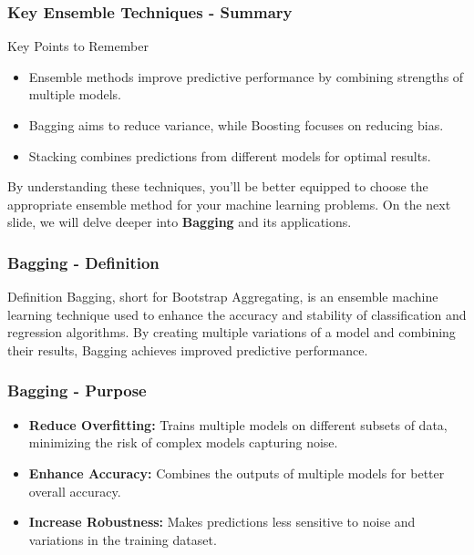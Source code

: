 \documentclass[aspectratio=169]{beamer}
\begin{document}
\begin{frame}[fragile]
    \frametitle{Key Ensemble Techniques - Summary}
    \begin{block}{Key Points to Remember}
        \begin{itemize}
            \item Ensemble methods improve predictive performance by combining strengths of multiple models.
            \item Bagging aims to reduce variance, while Boosting focuses on reducing bias.
            \item Stacking combines predictions from different models for optimal results.
        \end{itemize}
    \end{block}
    By understanding these techniques, you'll be better equipped to choose the appropriate ensemble method for your machine learning problems. 
    On the next slide, we will delve deeper into \textbf{Bagging} and its applications.
\end{frame}

\begin{frame}[fragile]
    \frametitle{Bagging - Definition}
    \begin{block}{Definition}
        Bagging, short for Bootstrap Aggregating, is an ensemble machine learning technique used to enhance the accuracy and stability of classification and regression algorithms. By creating multiple variations of a model and combining their results, Bagging achieves improved predictive performance.
    \end{block}
\end{frame}

\begin{frame}[fragile]
    \frametitle{Bagging - Purpose}
    \begin{itemize}
        \item \textbf{Reduce Overfitting:} Trains multiple models on different subsets of data, minimizing the risk of complex models capturing noise.
        \item \textbf{Enhance Accuracy:} Combines the outputs of multiple models for better overall accuracy.
        \item \textbf{Increase Robustness:} Makes predictions less sensitive to noise and variations in the training dataset.
    \end{itemize}
\end{frame}
\end{document}
